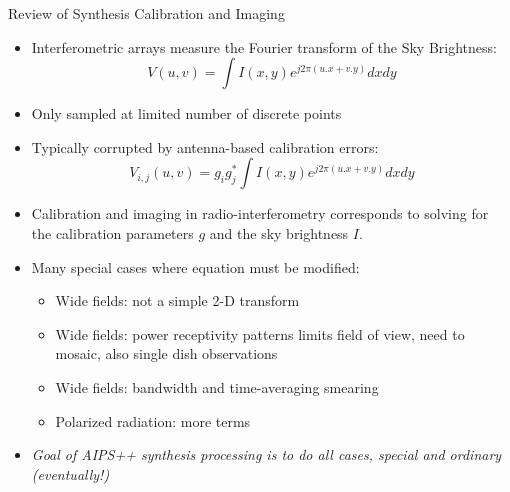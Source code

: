 \begin{slide}{Review of Synthesis Calibration and Imaging}
\begin{itemize}
\item Interferometric arrays measure the Fourier transform of the
Sky Brightness:
\begin{equation}
V(u,v) = \int I(x,y) e^{j 2\pi \left(u.x+v.y\right)} dx dy
\end{equation}
\item Only sampled at limited number of discrete points
\item Typically corrupted by antenna-based calibration errors:
\begin{equation}
V_{i,j}(u,v) = g_i g_j^* \int I(x,y) e^{j 2\pi \left(u.x+v.y\right)} dx dy
\end{equation}
\item Calibration and imaging in radio-interferometry corresponds to
solving for the calibration parameters $g$ and the sky brightness $I$.
\item Many special cases where equation must be modified:
\begin{itemize}
\item Wide fields: not a simple 2-D transform
\item Wide fields: power receptivity patterns limits field of view, need to
mosaic, also single dish observations
\item Wide fields: bandwidth and time-averaging smearing
\item Polarized radiation: more terms
\end{itemize}
\item {\em Goal of AIPS++ synthesis processing is to do all cases, special and
ordinary (eventually!)}
\end{itemize}
\end{slide}


